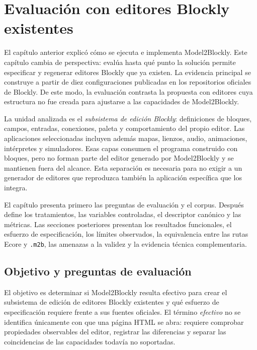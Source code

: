 \chapter{Evaluación con editores Blockly existentes}
\label{chap:evaluacion}
\label{chap:casos-evaluacion}

El capítulo anterior explicó cómo se ejecuta e implementa Model2Blockly. Este
capítulo cambia de perspectiva: evalúa hasta qué punto la solución permite
especificar y regenerar editores Blockly que ya existen. La evidencia principal
se construye a partir de diez configuraciones publicadas en los repositorios oficiales de
Blockly. De este modo, la evaluación contrasta la propuesta con editores cuya
estructura no fue creada para ajustarse a las capacidades de Model2Blockly.

La unidad analizada es el \emph{subsistema de edición Blockly}: definiciones de
bloques, campos, entradas, conexiones, paleta y comportamiento del propio
editor. Las aplicaciones seleccionadas incluyen además mapas, lienzos, audio,
animaciones, intérpretes y simuladores. Esas capas consumen el programa construido
con bloques, pero no forman parte del editor generado por Model2Blockly y se
mantienen fuera del alcance. Esta separación es necesaria para no exigir a un
generador de editores que reproduzca también la aplicación específica que los
integra.

El capítulo presenta primero las preguntas de evaluación y el corpus. Después
define los tratamientos, las variables controladas, el descriptor canónico y
las métricas. Las secciones posteriores presentan los resultados funcionales,
el esfuerzo de especificación, los límites observados, la equivalencia entre
las rutas Ecore y \texttt{.m2b}, las amenazas a la validez y la evidencia
técnica complementaria.

\section{Objetivo y preguntas de evaluación}
\label{sec:objetivo-evaluacion}

El objetivo es determinar si Model2Blockly resulta efectivo para crear el
subsistema de edición de editores Blockly existentes y qué esfuerzo de
especificación requiere frente a sus fuentes oficiales. El término
\emph{efectivo} no se identifica únicamente con que una página HTML se abra:
requiere comprobar propiedades observables del editor, registrar las diferencias
y separar las coincidencias de las capacidades todavía no soportadas.

